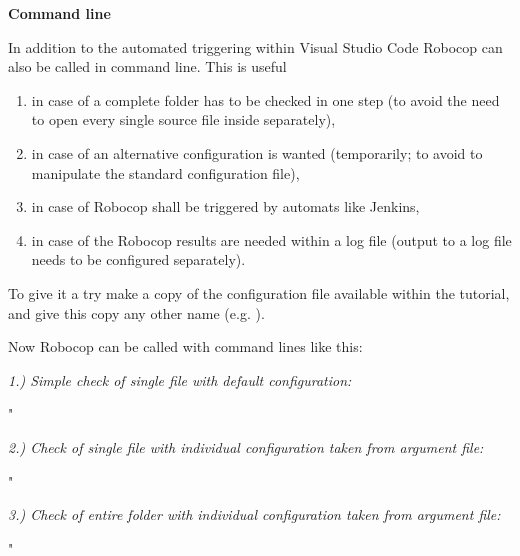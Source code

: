 \newpage

\textbf{Command line}

In addition to the automated triggering within Visual Studio Code Robocop can also be called in command line. This is useful
\begin{enumerate}
   \item in case of a complete folder has to be checked in one step (to avoid the need to open every single source file inside separately),
   \item in case of an alternative configuration is wanted (temporarily; to avoid to manipulate the standard configuration file),
   \item in case of Robocop shall be triggered by automats like Jenkins,
   \item in case of the Robocop results are needed within a log file (output to a log file needs to be configured separately).
\end{enumerate}

To give it a try make a copy of the configuration file  available within the tutorial, and give this copy any other name (e.g. ).

Now Robocop can be called with command lines like this:

\vspace{2ex}

\textit{1.) Simple check of single file with default configuration:}

\begin{pythoncode}
"%
\end{pythoncode}

\vspace{2ex}

\textit{2.) Check of single file with individual configuration taken from argument file:}

\begin{pythoncode}
"%
\end{pythoncode}

\vspace{2ex}

\textit{3.) Check of entire folder with individual configuration taken from argument file:}

\begin{pythoncode}
"%
\end{pythoncode}

